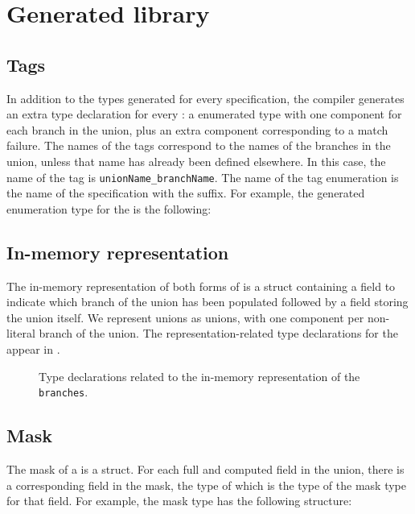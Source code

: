 \section{Generated library}
\subsection{Tags}
\label{sec:unions-tags}
In addition to the types generated for every \pads{} specification,
the \pads{} compiler generates an extra type 
declaration for every \Punion{}: a enumerated type with one component
for each branch in the union, plus an extra component corresponding to
a match failure.  The names of the tags correspond to the names of the
branches in the union, unless that name
has already been defined 
elsewhere.  In this case, the name of the tag is 
\texttt{unionName\_branchName}.  
The name of the tag enumeration is the name of
the \pads{} specification with the  suffix.
For example, the generated enumeration type
for the \Punion{}  is the following:

%


\subsection{In-memory representation}
\label{sec:unions-rep}
The in-memory representation of both forms of \Punion{} is 
a \C{} struct containing a  field to indicate which branch of the
union has been populated followed by a  field storing the union
itself.  We represent unions as \C{} unions, with one component per
non-literal branch of the union.  
The representation-related type declarations for
the \Punion{}  appear in .

\begin{figure}
\caption{Type declarations related to the in-memory representation of
  the \Punion{} \texttt{branches}.}
\label{fig:punion-rep}
\end{figure}

\subsection{Mask}
\label{sec:unions-masks}
The mask of a \Punion{} is a \C{} struct.  
For each full and computed field in the union,
there is a corresponding field in the mask, the type of which is the
type of the mask type for that field.   For example, the mask type
 has the following structure:

